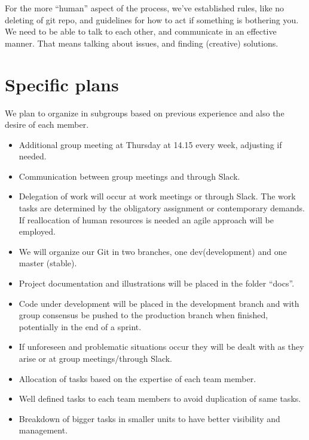 \documentclass{article}
\begin{document}
For the more “human” aspect of the process, we’ve established rules, like no deleting of git repo, and guidelines for how to act if something is bothering you. We need to be able to talk to each other, and communicate in an effective manner. That means talking about issues, and finding (creative) solutions. 

\section*{Specific plans}
 We plan to organize in subgroups based on previous experience and also the desire of each member.

\begin{itemize}
	
	

\item Additional group meeting at Thursday at 14.15 every week, adjusting if needed.
\item Communication between group meetings and through Slack.
\item Delegation of work will occur at work meetings or through Slack. The work tasks are determined by the obligatory assignment or contemporary demands. If reallocation of human resources is needed an agile approach will be employed. 
\item We will organize our Git in two branches, one dev(development) and one master (stable).
\item Project documentation and illustrations will be placed in the folder “docs”. 
\item Code under development will be placed in the development branch and with group consensus be pushed to the production branch when finished, potentially in the end of a sprint.
\item If unforeseen and problematic situations occur they will be dealt with as they arise or at group meetings/through Slack.
\item Allocation of tasks based on the expertise of each team member.
\item Well defined tasks to each team members to avoid duplication of same tasks.
\item Breakdown of bigger tasks in smaller units to have better visibility and management. 
\end{itemize}
\end{document}
